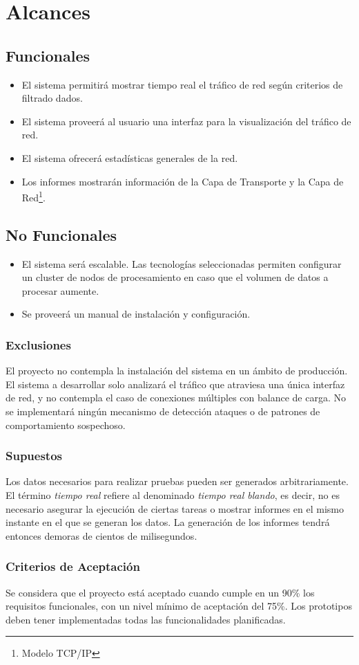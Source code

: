 \section*{Alcances}

\subsection*{Funcionales}
\begin{itemize}
	\item El sistema permitirá mostrar tiempo real el tráfico de red según criterios de filtrado dados.
	\item El sistema proveerá al usuario una interfaz para la visualización del tráfico de red.
	\item El sistema ofrecerá estadísticas generales de la red.
	\item Los informes mostrarán información de la Capa de Transporte y la Capa de Red\footnote{Modelo TCP/IP}.\cite{rfc791}\cite{rfc793}\cite{rfc1180}
\end{itemize}

\subsection*{No Funcionales}
\begin{itemize}
	\item El sistema será escalable. Las tecnologías seleccionadas permiten configurar un cluster de nodos de procesamiento en caso que el volumen de datos a procesar aumente.
	\item Se proveerá un manual de instalación y configuración.
\end{itemize}

\subsubsection{Exclusiones}
El proyecto no contempla la instalación del sistema en un ámbito de producción.
El sistema a desarrollar solo analizará el tráfico que atraviesa una única interfaz de red, y no contempla el caso de conexiones múltiples con balance de carga.
No se implementará ningún mecanismo de detección ataques o de patrones de comportamiento sospechoso.

\subsubsection{Supuestos}
Los datos necesarios para realizar pruebas pueden ser generados arbitrariamente.
El término \textit{tiempo real} refiere al denominado \textit{tiempo real blando}, es decir, no es necesario asegurar la ejecución de ciertas tareas o mostrar informes en el mismo instante en el que se generan los datos. La generación de los informes tendrá entonces demoras de cientos de milisegundos.

\subsubsection{Criterios de Aceptación}
Se considera que el proyecto está aceptado cuando cumple en un 90\% los requisitos funcionales, con un nivel mínimo de aceptación del 75\%. Los prototipos deben tener implementadas todas las funcionalidades planificadas.

